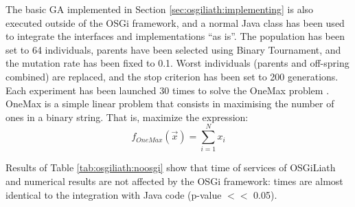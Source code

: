  The basic GA implemented in Section \ref{sec:osgiliath:implementing} is also executed outside of
 the OSGi framework, and a normal Java class has been used to
 integrate the interfaces and implementations ``as is''. The
 population has been set to 64 individuals, parents have been selected
 using Binary Tournament, and the mutation rate has been fixed to
 0.1. %
Worst individuals (parents and off-spring combined) are replaced, and
the stop criterion has been set to 200 generations. Each experiment
has been launched 30 times to solve the OneMax problem
\cite{SchafferOnemax91}. OneMax is a simple linear problem 
that consists in maximising the number of ones in a binary string. That is, maximize the expression:
\begin{equation}
f_{OneMax}(\vec{x}) = \sum_{i=1}^{N}{x_{i}}
\end{equation}




Results of Table \ref{tab:osgiliath:noosgi} show that time of services of OSGiLiath and numerical results are not affected by the
OSGi framework: times are almost identical to the integration with
Java code (p-value $<<$ 0.05).

\begin{table}
\caption{Comparison of tested EA frameworks in time and development.}
\label{tab:osgiliath:noosgi}
\end{table}




